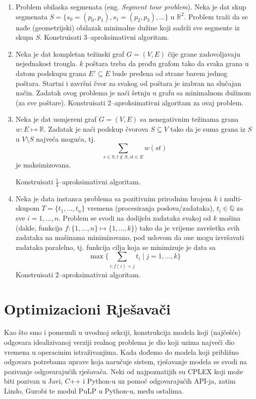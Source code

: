 \documentclass[a4paper, utf8, 11pt, colorlinks]{book}
\begin{document}
\begin{enumerate}
		 \item %
		 Problem obilaska segmenata (eng. \emph{Segment tour problem}). Neka je dat skup segmenata $S = \{s_0 = (p_0, p_1), s_1 =(p_2, p_3),\ldots\}$ u $\mathbb{R}^2$. Problem traži da se nađe (geometrijski) obilazak minimalne dužine koji sadrži sve segmente iz skupa $S$. Konstruisati 3--aproksimativni algoritam.  
		 \item Neka je dat kompletan težinski graf $G=(V,E)$ čije grane zadovoljavaju nejednakost trougla. $ k$ poštara treba da prođu grafom tako da svaka grana u datom podskupu grana $E' \subseteq E$ bude pređena  od strane barem jednog poštara. Startni i završni čvor za svakog od poštara je izabran na slučajan način. Zadatak ovog problema je naći šetnju u grafu sa minimalnom dužinom (za sve poštare). 
		 Konstruisati 2--aproksimativni algoritam za ovaj problem. 
		 \item %
		 Neka je dat usmjereni graf $G = (V,E) $ sa nenegativnim težinama grana $w:E\mapsto\mathbb{R}$. Zadatak je naći  podskup čvorova $S \subseteq V$ tako da je suma grana iz $S$ u $V\setminus S$ najveća moguća, tj. 
		  $$ \sum_{s \in S, t \notin S, st \in E }w(st)$$
		  je maksimizovana.  
		  
		  Konstruisati $\frac{1}{4}$--aproksimativni algoritam.
		 \item  %
		 Neka je data instanca problema sa pozitivnim prirodnim  brojem $k$ i multi-skupom 
		 $T = \{t_1,\ldots, t_n\}$ vremena (procesiranja poslova/zadataka), $t_i \in \mathbb{Q}$ za sve $i=1,\ldots, n$. 
		 Problem se svodi na dodijelu zadataka svakoj od $k$ mašina (dakle, funkcija $f:\{1,\ldots, n\} \mapsto \{1,\ldots, k\}$) tako da je vrijeme završetka svih zadataka na mašinama minimizovano, pod uslovom da one mogu izvršavati zadataka paralelno, tj. funkcija cilja koja se minimizuje je data sa 
		 $$\max \{\sum_{i: f(i) = j } t_i \mid j=1,\ldots, k \}$$
		 Konstruisati 2--aproksimativni algoritam.
\end{enumerate}



 \chapter{Optimizacioni Rješavači}
 
 Kao što smo i pomenuli u uvodnoj sekciji, konstrukcija modela koji (najčešće) odgovara idealizivanoj verziji realnog problema je 
 dio koji uzima najveći dio vremena u operacinim istraživanjima. Kada dođemo do modela koji približno odgovara potrebama uprave koja naručuje sistem, rješavanje modela se svodi na pozivanje odgovarajućih rješavača. Neki od najpoznatijih su 
 CPLEX koji može biti pozivan u Javi, $C$++ i Python-u uz pomoć odgovarajućih API-ja, zatim Lindo, Gurobi te modul PuLP u Python-u, među ostalima.  
 
\end{document}
